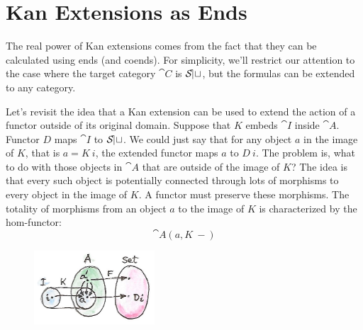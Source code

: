 \section{Kan Extensions as Ends}

The real power of Kan extensions comes from the fact that they can be
calculated using ends (and coends). For simplicity, we'll restrict our
attention to the case where the target category $\cat{C}$ is
$\mathcal{S\mkern-3mu et}$, but the formulas can be extended to any category.

Let's revisit the idea that a Kan extension can be used to extend the
action of a functor outside of its original domain. Suppose that
$K$ embeds $\cat{I}$ inside $\cat{A}$. Functor $D$ maps
$\cat{I}$ to $\mathcal{S\mkern-3mu et}$. We could just say that for any object
$a$ in the image of $K$, that is $a = K\ i$, the
extended functor maps $a$ to $D\ i$. The problem is, what
to do with those objects in $\cat{A}$ that are outside of the image of
$K$? The idea is that every such object is potentially connected
through lots of morphisms to every object in the image of $K$. A
functor must preserve these morphisms. The totality of morphisms from an
object $a$ to the image of $K$ is characterized by the
hom-functor:
\[\cat{A}(a, K\ -)\]

\begin{figure}[H]
\centering
\includegraphics[width=0.4\textwidth]{images/kan13.jpg}
\end{figure}

